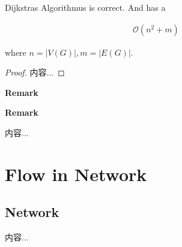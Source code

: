 \documentclass[Total.tex]{subfiles}
\begin{document}
		
		\begin{proposition}
			Dijkstras Algorithmus is correct. And has a 
			
			\begin{gather*}
				\mathcal{O}(n^2+m)
			\end{gather*}
			
			where $n=|V(G)|,m=|E(G)|$.
		\end{proposition}
		
		\begin{proof}
			内容...
		\end{proof}
		
		\textbf{Remark}
		
		\textbf{Remark}
		
		\begin{Def}
			内容...
		\end{Def}
		
	
	\chapter{Flow in Network}
		\section{Network}
			\begin{Def}
				内容...
			\end{Def}
		
			
\end{document}

